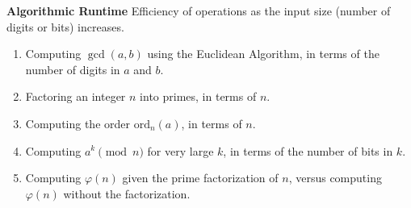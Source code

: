 \documentclass[12pt]{article}
\begin{document}
\textbf{ Algorithmic Runtime}
Efficiency of operations as the input size (number of digits or bits) increases.

\begin{enumerate}
    \item Computing $\gcd(a, b)$ using the Euclidean Algorithm, in terms of the number of digits in $a$ and $b$.
    \item Factoring an integer $n$ into primes, in terms of $n$.
    \item Computing the order $\text{ord}_n(a)$, in terms of $n$.
    \item Computing $a^k \pmod{n}$ for very large $k$, in terms of the number of bits in $k$.
    \item Computing $\varphi(n)$ given the prime factorization of $n$, versus computing $\varphi(n)$ without the factorization.
\end{enumerate}
\end{document}
